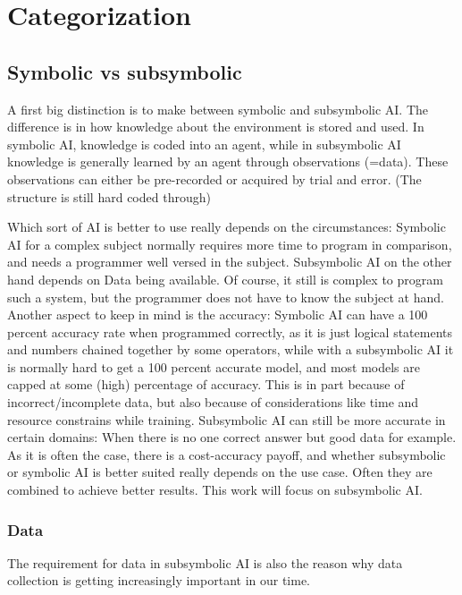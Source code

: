 \chapter{Categorization}
\section{Symbolic vs subsymbolic}
A first big distinction is to make between symbolic and subsymbolic AI. 
The difference is in how knowledge about the environment is stored and used. %
In symbolic AI, knowledge is coded into an agent, while in subsymbolic AI knowledge is generally learned by an agent through observations (=data). These observations can either be pre-recorded or acquired by trial and error. (The structure is still hard coded through)

Which sort of AI is better to use really depends on the circumstances: 
Symbolic AI for a complex subject normally requires more time to program in comparison, and needs a programmer well versed in the subject. 
Subsymbolic AI on the other hand depends on Data being available. Of course, it still is complex to program such a system, but the programmer does not have to know the subject at hand. %
Another aspect to keep in mind is the accuracy: Symbolic AI can have a 100 percent accuracy rate when programmed correctly, as it is just logical statements and numbers chained together by some operators, while with a subsymbolic AI it is normally hard to get a 100 percent accurate model, and most models are capped at some (high) percentage of accuracy. This is in part because of incorrect/incomplete data, but also because of considerations like time and resource constrains while training. Subsymbolic AI can still be more accurate in certain domains: When there is no one correct answer but good data for example.
As it is often the case, there is a cost-accuracy payoff, and whether subsymbolic or symbolic AI is better suited really depends on the use case. Often they are combined to achieve better results. This work will focus on subsymbolic AI. 
\subsection{Data}
The requirement for data in subsymbolic AI is also the reason why data collection is getting increasingly important in our time. 
